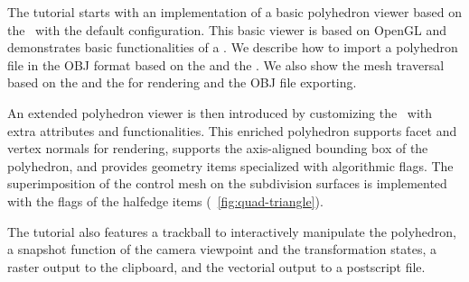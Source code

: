 The tutorial starts with an implementation of a basic polyhedron
viewer based on the \cgalpoly\ with the default configuration.  This
basic viewer is based on OpenGL and demonstrates basic functionalities
of a \cgalpoly . We describe how to import a polyhedron file in the
OBJ format based on the  and the
. We also show the mesh traversal based on
the  and the  for rendering and
the OBJ file exporting.

An extended polyhedron viewer is then introduced by customizing the
\poly\ with extra attributes and functionalities. This enriched
polyhedron supports facet and vertex normals for rendering, supports
the axis-aligned bounding box of the polyhedron, and provides geometry
items specialized with algorithmic flags.  The superimposition of the
control mesh on the subdivision surfaces is implemented with the flags
of the halfedge items (\figurename\ \ref{fig:quad-triangle}).

The tutorial also features a trackball to interactively manipulate the
polyhedron, a snapshot function of the camera viewpoint and the
transformation states, a raster output to the clipboard, and the
vectorial output to a postscript file.
